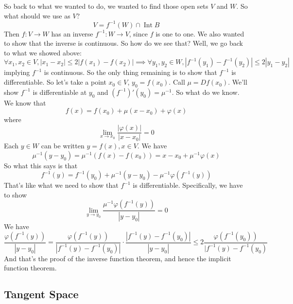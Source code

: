 \documentclass{article}
\DeclareMathOperator{\Int}{Int}
\begin{document}
So back to what we wanted to do, we wanted to find those open sets \(V\) and \(W\). So what should we use as \(V\)?
\begin{equation}V = f^{-1}(W) \cap \Int B\end{equation}
Then \(f: V \to W\) has an inverse \(f^{-1}: W \to V\), since \(f\) is one to one. We also wanted to show that the inverse is continuous. So how do we see that? Well, we go back to what we showed above:
\begin{equation}\forall x_1, x_2 \in V, |x_1 - x_2| \leq 2|f(x_1) - f(x_2)| \implies \forall y_1, y_2 \in W, |f^{-1}(y_1) - f^{-1}(y_2)| \leq 2|y_1 - y_2|\end{equation}
implying \(f^{-1}\) is continuous. So the only thing remaining is to show that \(f^{-1}\) is differentiable. So let's take a point \(x_0 \in V\), \(y_0 = f(x_0)\). Call \(\mu = Df(x_0)\). We'll show \(f^{-1}\) is differentiable at \(y_0\) and \((f^{-1})'(y_0) = \mu^{-1}\). So what do we know. We know that
\begin{equation}f(x) = f(x_0) + \mu(x - x_0) + \varphi(x)\end{equation}
where
\begin{equation}\lim_{x \to x_0}\frac{|\varphi(x)|}{|x - x_0|} = 0\end{equation}
Each \(y \in W\) can be written \(y = f(x), x \in V\). We have
\begin{equation}\mu^{-1}(y - y_0) = \mu^{-1}(f(x) - f(x_0)) = x - x_0 + \mu^{-1}\varphi(x)\end{equation}
So what this says is that
\begin{equation}f^{-1}(y) = f^{-1}(y_0) + \mu^{-1}(y - y_0) - \mu^{-1}\varphi(f^{-1}(y))\end{equation}
That's like what we need to show that \(f^{-1}\) is differentiable. Specifically, we have to show
\begin{equation}\lim_{y \to y_0}\frac{\mu^{-1}\varphi(f^{-1}(y))}{|y - y_0|} = 0\end{equation}
We have
\begin{equation}\frac{\varphi(f^{-1}(y))}{|y - y_0|} = \frac{\varphi(f^{-1}(y))}{|f^{-1}(y) - f^{-1}(y_0)|} \cdot \frac{|f^{-1}(y) - f^{-1}(y_0)|}{|y - y_0|} \leq 2\frac{\varphi(f^{-1}(y_0))}{|f^{-1}(y) - f^{-1}(y_0)}\end{equation}
And that's the proof of the inverse function theorem, and hence the implicit function theorem.


\subsection{Tangent Space}
\end{document}
